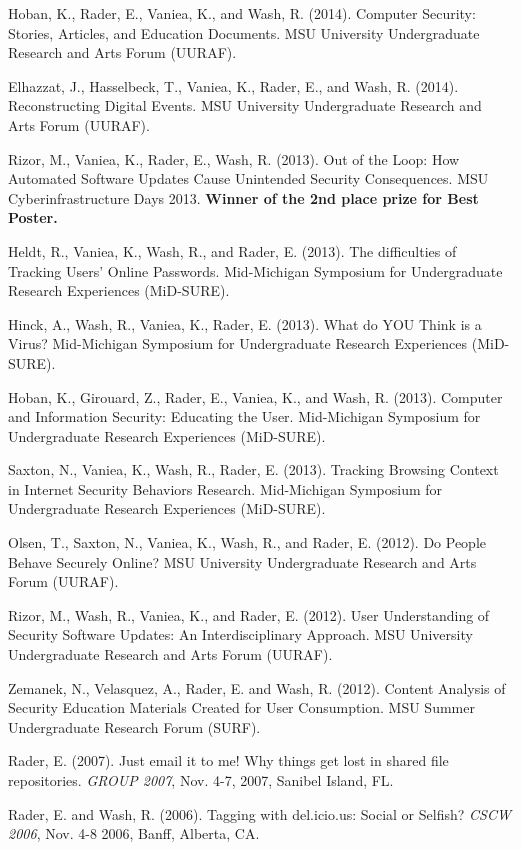 \documentclass[9pt]{extarticle}
\begin{document}
Hoban, K., Rader, E., Vaniea, K., and Wash, R. (2014). Computer Security: Stories, Articles, and Education Documents. MSU University Undergraduate Research and Arts Forum (UURAF).

Elhazzat, J., Hasselbeck, T., Vaniea, K., Rader, E., and Wash, R. (2014). Reconstructing Digital Events. MSU University Undergraduate Research and Arts Forum (UURAF).

Rizor, M., Vaniea, K., Rader, E., Wash, R. (2013). Out of the Loop: How Automated Software Updates Cause Unintended Security Consequences. MSU Cyberinfrastructure Days 2013. \textbf{Winner of the 2nd place prize for Best Poster.}

Heldt, R., Vaniea, K., Wash, R., and Rader, E. (2013). The difficulties of Tracking Users' Online Passwords. Mid-Michigan Symposium for Undergraduate Research Experiences (MiD-SURE). 

Hinck, A., Wash, R., Vaniea, K., Rader, E. (2013). What do YOU Think is a Virus? Mid-Michigan Symposium for Undergraduate Research Experiences (MiD-SURE).

Hoban, K., Girouard, Z., Rader, E., Vaniea, K., and Wash, R. (2013). Computer and Information Security: Educating the User. Mid-Michigan Symposium for Undergraduate Research Experiences (MiD-SURE).

Saxton, N., Vaniea, K., Wash, R., Rader, E. (2013). Tracking Browsing Context in Internet Security Behaviors Research. Mid-Michigan Symposium for Undergraduate Research Experiences (MiD-SURE).

Olsen, T., Saxton, N., Vaniea, K., Wash, R., and Rader, E. (2012). Do People Behave Securely Online? MSU University Undergraduate Research and Arts Forum (UURAF).

Rizor, M., Wash, R., Vaniea, K., and Rader, E. (2012). User Understanding of Security Software Updates: An Interdisciplinary Approach. MSU University Undergraduate Research and Arts Forum (UURAF).

Zemanek, N., Velasquez, A., Rader, E. and Wash, R. (2012). Content Analysis of Security Education Materials Created for User Consumption. MSU Summer Undergraduate Research Forum (SURF).
  
Rader, E. (2007). Just email it to me! Why things get lost in shared file repositories. \emph{GROUP 2007}, Nov. 4-7, 2007, Sanibel Island, FL.

Rader, E. and Wash, R. (2006). Tagging with del.icio.us: Social or Selfish? \emph{CSCW 2006}, Nov. 4-8 2006, Banff, Alberta, CA.
 
\end{document}
